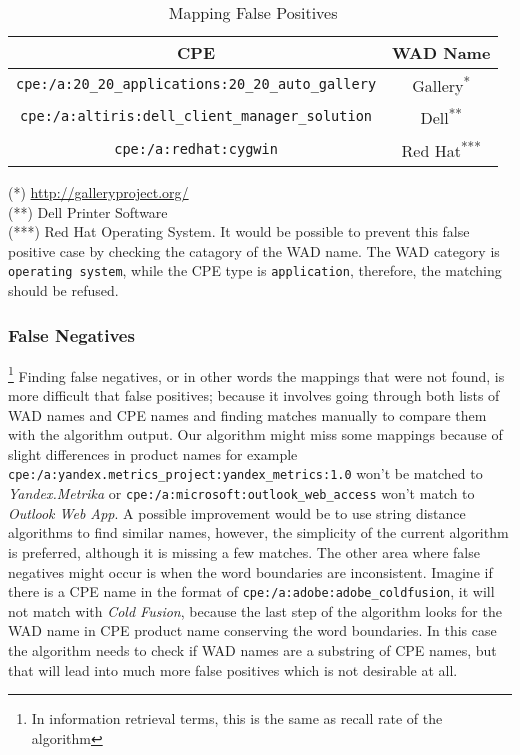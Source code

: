 {{\begin{table}
\begin{center}
\begin{tabular}{ | c | c | }
    \hline
	 
    CPE & WAD Name  
    \\ \hline
    \texttt{cpe:/a:20\_20\_applications:20\_20\_auto\_gallery} & Gallery\textsuperscript{*}
        \\ \hline
    \texttt{cpe:/a:altiris:dell\_client\_manager\_solution} & Dell\textsuperscript{**}
        \\ \hline
    \texttt{cpe:/a:redhat:cygwin} & Red Hat\textsuperscript{***}
        \\ \hline
    \end{tabular}
    \caption{Mapping False Positives}
    \label{table:false_positives}
   \end{center}
      \footnotesize{(*) \url{http://galleryproject.org/}\\
      (**) Dell Printer Software \\
      (***) Red Hat Operating System. It would be possible to prevent this false positive case by checking the catagory of the WAD name. The WAD category is \texttt{operating system}, while the CPE type is \texttt{application}, therefore, the matching should be refused. 
      }
\end{table}

\subsubsection{False Negatives}\footnote{In information retrieval terms, this is the same as recall rate of the algorithm}
Finding false negatives, or in other words the mappings that were not found, is more difficult that false positives; because it involves going through both lists of WAD names and CPE names and finding matches manually to compare them with the algorithm output. Our algorithm might miss some mappings because of slight differences in product names for example  \texttt{cpe:/a:yandex.metrics\_project:yandex\_metrics:1.0} won't be matched to \textit{Yandex.Metrika} or \texttt{cpe:/a:microsoft:outlook\_web\_access} won't match to \textit{Outlook Web App}. A possible improvement would be to use string distance algorithms to find similar names, however, the simplicity of the current algorithm is preferred, although it is missing a few matches. 
The other area where false negatives might occur is when the word boundaries are inconsistent. Imagine if there is a CPE name in the format of \texttt{cpe:/a:adobe:adobe\_coldfusion}, it will not match with \textit{Cold Fusion}, because the last step of the algorithm looks for the WAD name in CPE product name conserving the word boundaries. In this case the algorithm needs to check if WAD names are a substring of CPE names, but that will lead into much more false positives which is not desirable at all.  

}}
